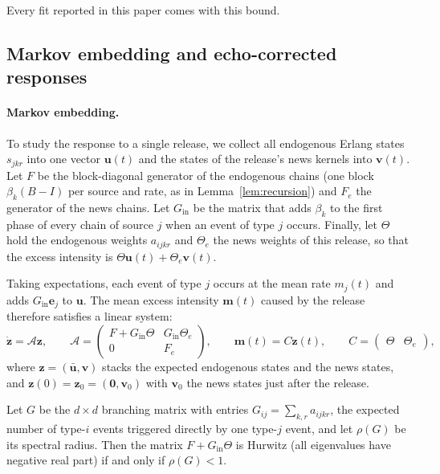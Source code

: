 Every fit reported in this paper comes with this bound.

\subsection{Markov embedding and echo-corrected responses}
\paragraph{Markov embedding.} To study the response to a single release, we collect all
endogenous Erlang states $s_{jkr}$ into one vector $\bm u(t)$ and the states of the release's
news kernels into $\bm v(t)$. Let $F$ be the block-diagonal generator of the endogenous chains
(one block $\beta_k(B-I)$ per source and rate, as in Lemma~\ref{lem:recursion}) and $F_e$ the
generator of the news chains. Let $G_{\mathrm{in}}$ be the matrix that adds $\beta_k$ to the first
phase of every chain of source $j$ when an event of type $j$ occurs. Finally, let $\Theta$ hold the
endogenous weights $a_{ijkr}$ and $\Theta_e$ the news weights of this release, so that the excess
intensity is $\Theta\bm u(t)+\Theta_e\bm v(t)$.

Taking expectations, each event of type $j$ occurs at the mean rate $m_j(t)$ and adds
$G_{\mathrm{in}}\bm e_j$ to $\bm u$. The mean excess intensity $\bm m(t)$ caused by the release
therefore satisfies a linear system:
\begin{equation}\label{eq:embedding}
\dot{\bm z}=\mathcal A\bm z,\qquad
\mathcal A=\begin{pmatrix}F+G_{\mathrm{in}}\Theta & G_{\mathrm{in}}\Theta_e\\ 0 & F_e\end{pmatrix},\qquad
\bm m(t)=C\bm z(t),\qquad C=\begin{pmatrix}\Theta&\Theta_e\end{pmatrix},
\end{equation}
where $\bm z=(\bar{\bm u},\bm v)$ stacks the expected endogenous states and the news states, and
$\bm z(0)=\bm z_0=(\bm 0,\bm v_0)$ with $\bm v_0$ the news states just after the release.

\begin{theorem}[Stability]\label{thm:stab}
Let $G$ be the $d\times d$ branching matrix with entries $G_{ij}=\sum_{k,r}a_{ijkr}$, the expected
number of type-$i$ events triggered directly by one type-$j$ event, and let $\rho(G)$ be its
spectral radius. Then the matrix $F+G_{\mathrm{in}}\Theta$ is Hurwitz (all eigenvalues have negative
real part) if and only if $\rho(G)<1$.
\end{theorem}

